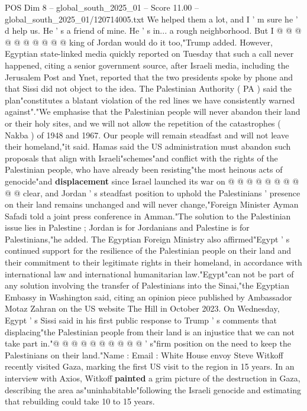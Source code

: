 \begin{textsample}{POS Dim 8 – global\_south\_2025\_01 – Score 11.00 – global\_south\_2025\_01/120714005.txt}
We helped them a lot, and I ' m sure he ' d help us.
He ' s a friend of mine.
He ' s in... a rough neighborhood.
But I @ @ @ @ @ @ @ @ @ @ king of Jordan would do it too,"Trump added.
However, Egyptian state-linked media quickly reported on Tuesday that such a call never happened, citing a senior government source, after Israeli media, including the Jerusalem Post and Ynet, reported that the two presidents spoke by phone and that Sissi did not object to the idea.
The Palestinian Authority ( PA ) said the plan"constitutes a blatant violation of the red lines we have consistently warned against"."We emphasise that the Palestinian people will never abandon their land or their holy sites, and we will not allow the repetition of the catastrophes ( Nakba ) of 1948 and 1967.
Our people will remain steadfast and will not leave their homeland,"it said.
Hamas said the US administration must abandon such proposals that align with Israeli"schemes"and conflict with the rights of the Palestinian people, who have already been resisting"the most heinous acts of genocide"and \textbf{displacement} since Israel launched its war on @ @ @ @ @ @ @ @ @ @ clear, and Jordan ' s steadfast position to uphold the Palestinians ' presence on their land remains unchanged and will never change,"Foreign Minister Ayman Safadi told a joint press conference in Amman."The solution to the Palestinian issue lies in Palestine ; Jordan is for Jordanians and Palestine is for Palestinians,"he added.
The Egyptian Foreign Ministry also affirmed"Egypt ' s continued support for the resilience of the Palestinian people on their land and their commitment to their legitimate rights in their homeland, in accordance with international law and international humanitarian law."Egypt"can not be part of any solution involving the transfer of Palestinians into the Sinai,"the Egyptian Embassy in Washington said, citing an opinion piece published by Ambassador Motaz Zahran on the US website The Hill in October 2023.
On Wednesday, Egypt ' s Sissi said in his first public response to Trump ' s comments that displacing"the Palestinian people from their land is an injustice that we can not take part in."@ @ @ @ @ @ @ @ @ @ ' s"firm position on the need to keep the Palestinians on their land."Name : Email : White House envoy Steve Witkoff recently visited Gaza, marking the first US visit to the region in 15 years.
In an interview with Axios, Witkoff \textbf{painted} a grim picture of the destruction in Gaza, describing the area as"uninhabitable"following the Israeli genocide and estimating that rebuilding could take 10 to 15 years.

\end{textsample}
